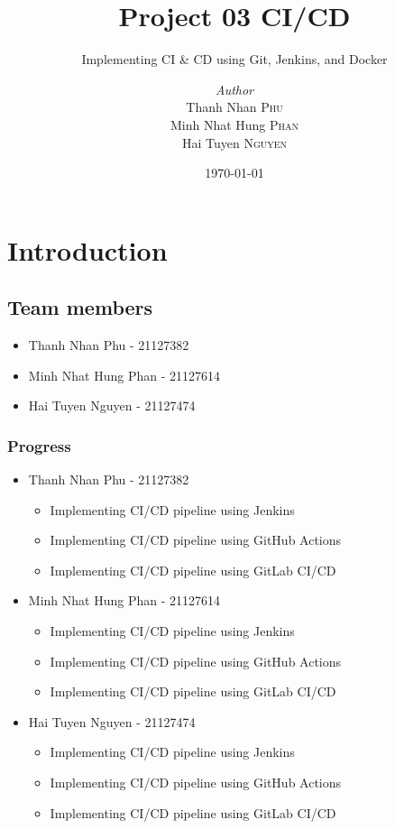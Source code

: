 \documentclass[a4paper, 12pt]{report}
\institute{University of Science - VNUHCM}
\title{Project 03 CI/CD}
\subtitle{Implementing CI \& CD using Git, Jenkins, and Docker}
\author{\textit{Author}\\Thanh Nhan \textsc{Phu}
                       \\Minh Nhat Hung \textsc{Phan}
                       \\Hai Tuyen \textsc{Nguyen}}
\date{\today}
\begin{document}
    \maketitle
    \romantableofcontents

    \chapter{Introduction}
    \section{Team members}

    \begin{itemize}
        \item Thanh Nhan Phu - 21127382
        \item Minh Nhat Hung Phan - 21127614
        \item Hai Tuyen Nguyen - 21127474
    \end{itemize}

    \subsection{Progress}
    \begin{itemize}
        \item Thanh Nhan Phu - 21127382
        \begin{itemize}
            \item Implementing CI/CD pipeline using Jenkins
            \item Implementing CI/CD pipeline using GitHub Actions
            \item Implementing CI/CD pipeline using GitLab CI/CD
        \end{itemize}
        \item Minh Nhat Hung Phan - 21127614
        \begin{itemize}
            \item Implementing CI/CD pipeline using Jenkins
            \item Implementing CI/CD pipeline using GitHub Actions
            \item Implementing CI/CD pipeline using GitLab CI/CD
        \end{itemize}
        \item Hai Tuyen Nguyen - 21127474
        \begin{itemize}
            \item Implementing CI/CD pipeline using Jenkins
            \item Implementing CI/CD pipeline using GitHub Actions
            \item Implementing CI/CD pipeline using GitLab CI/CD
        \end{itemize}
    \end{itemize}
\end{document}
